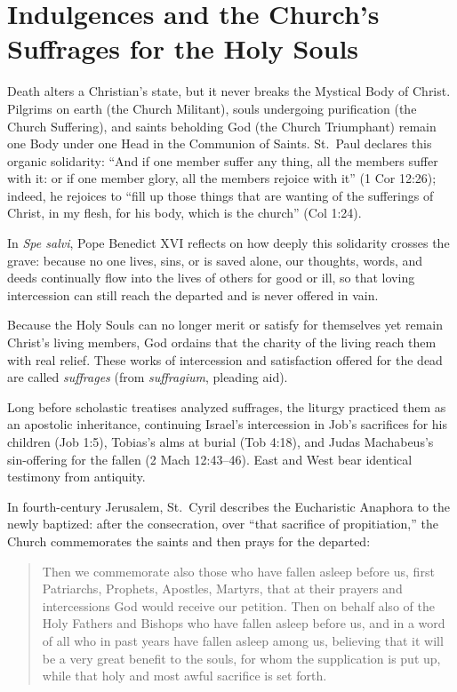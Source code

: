 \section{Indulgences and the Church's Suffrages for the Holy Souls}

Death alters a Christian's state, but it never breaks the Mystical Body of Christ. Pilgrims on earth (the Church Militant), souls undergoing purification (the Church Suffering), and saints beholding God (the Church Triumphant) remain one Body under one Head in the Communion of Saints. St.\ Paul declares this organic solidarity: ``And if one member suffer any thing, all the members suffer with it: or if one member glory, all the members rejoice with it'' (1 Cor 12:26); indeed, he rejoices to ``fill up those things that are wanting of the sufferings of Christ, in my flesh, for his body, which is the church'' (Col 1:24).

In \textit{Spe salvi}, Pope Benedict XVI reflects on how deeply this solidarity crosses the grave: because no one lives, sins, or is saved alone, our thoughts, words, and deeds continually flow into the lives of others for good or ill, so that loving intercession can still reach the departed and is never offered in vain.

Because the Holy Souls can no longer merit or satisfy for themselves yet remain Christ's living members, God ordains that the charity of the living reach them with real relief. These works of intercession and satisfaction offered for the dead are called \textit{suffrages} (from \textit{suffragium}, pleading aid).

Long before scholastic treatises analyzed suffrages, the liturgy practiced them as an apostolic inheritance, continuing Israel's intercession in Job's sacrifices for his children (Job 1:5), Tobias's alms at burial (Tob 4:18), and Judas Machabeus's sin-offering for the fallen (2 Mach 12:43--46). East and West bear identical testimony from antiquity.

In fourth-century Jerusalem, St.\ Cyril describes the Eucharistic Anaphora to the newly baptized: after the consecration, over ``that sacrifice of propitiation,'' the Church commemorates the saints and then prays for the departed:

\begin{quote}
Then we commemorate also those who have fallen asleep before us, first Patriarchs, Prophets, Apostles, Martyrs, that at their prayers and intercessions God would receive our petition. Then on behalf also of the Holy Fathers and Bishops who have fallen asleep before us, and in a word of all who in past years have fallen asleep among us, believing that it will be a very great benefit to the souls, for whom the supplication is put up, while that holy and most awful sacrifice is set forth.
\end{quote}

